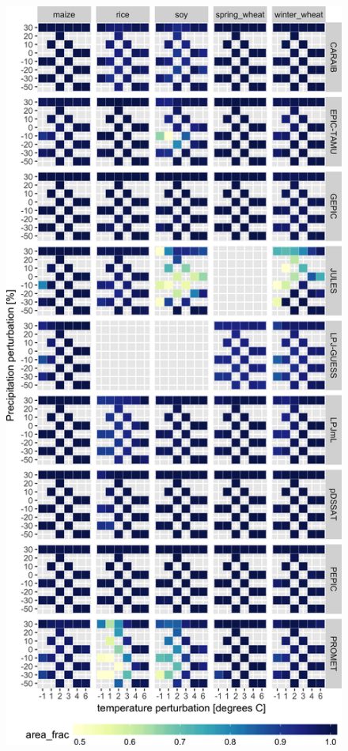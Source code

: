 \documentclass[10pt]{article}
\begin{document}
{\begin{figure}[h!]
\begin{minipage}{.45\textwidth}
    \includegraphics[width=\textwidth]{s_error_810.png}\\

\end{minipage}
\end{figure}}
\end{document}
